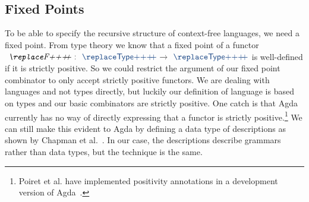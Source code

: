 \begin{code}[hide]
\AgdaSpace{}%
\<%
\\
%
\\[\AgdaEmptyExtraSkip]%
\>[0]\AgdaSpace{}%
\AgdaSpace{}%
\AgdaSpace{}%
\AgdaSpace{}%
\AgdaSymbol{(}\AgdaSpace{}%
\AgdaSpace{}%
\AgdaSpace{}%
\AgdaSymbol{;}\AgdaSpace{}%
\AgdaSpace{}%
\AgdaSpace{}%
\AgdaSpace{}%
\AgdaSymbol{;}\AgdaSpace{}%
\AgdaSpace{}%
\AgdaSpace{}%
\AgdaSpace{}%
\AgdaSymbol{;}\AgdaSpace{}%
\AgdaSpace{}%
\AgdaSpace{}%
\AgdaSpace{}%
\AgdaSymbol{;}\AgdaSpace{}%
\AgdaSpace{}%
\AgdaSpace{}%
\AgdaSpace{}%
\AgdaSymbol{;}\AgdaSpace{}%
\AgdaSpace{}%
\AgdaSpace{}%
\AgdaSymbol{)}\AgdaSpace{}%
\AgdaSpace{}%
\AgdaSymbol{(}\AgdaSpace{}%
\AgdaSymbol{;}\AgdaSpace{}%
\AgdaSymbol{)}\<%
\end{code}

\subsection{Fixed Points}

To be able to specify the recursive structure of context-free languages, we need a fixed point.
From type theory we know that a fixed point of a functor $\ab{F}~\as{:}~\af{Type}~\as{→}~\af{Type}$ is well-defined if it is strictly positive.
So we could restrict the argument of our fixed point combinator to only accept strictly positive functors.
We are dealing with languages and not types directly, but luckily our definition of language is based on types and our basic combinators are strictly positive.
One catch is that Agda currently has no way of directly expressing that a functor is strictly positive.\footnote{Poiret et al. have implemented positivity annotations in a development version of Agda~\cite{positivity}.}
We can still make this evident to Agda by defining a data type of descriptions as shown by Chapman et al.~\cite{levitation}. 
In our case, the descriptions describe grammars rather than data types, but the technique is the same.

